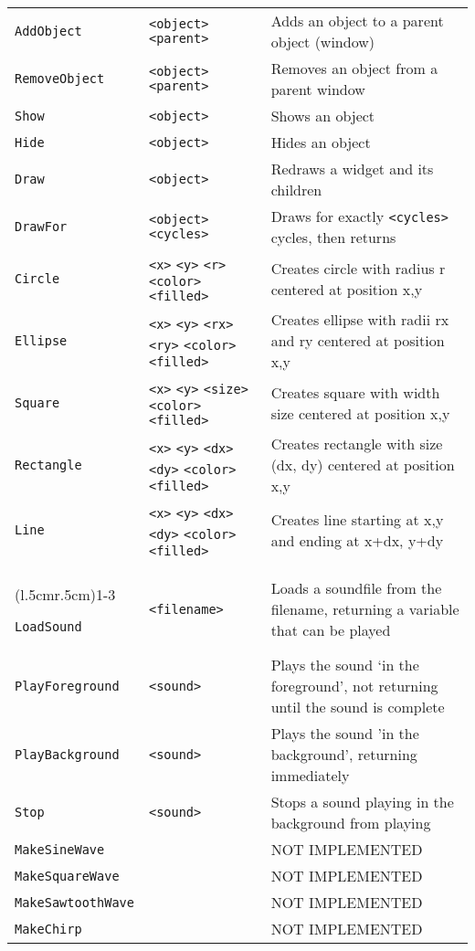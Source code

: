 \begin{longtable}{p{3cm}p{3cm}p{6cm}}
\verb+AddObject+ &\verb+<object>+ \verb+<parent>+ & Adds an object to a parent object (window)\\ 
\verb+RemoveObject+ &\verb+<object>+ \verb+<parent>+ &Removes an object from a parent window\\ 
\verb+Show+ &\verb+<object>+ &Shows an object\\ 
\verb+Hide+ &\verb+<object>+ &Hides an object\\ 
\verb+Draw+ &\verb+<object>+ &Redraws a widget and its children\\ 
\verb+DrawFor+ &\verb+<object>+ \verb+<cycles>+ &Draws for exactly \verb+<cycles>+ cycles, then returns\\ 
\verb+Circle+ &\verb+<x>+ \verb+<y>+ \verb+<r>+  \verb+<color>+ \verb+<filled>+&Creates circle with 
radius r centered at position x,y\\ 
\verb+Ellipse+ &\verb+<x>+ \verb+<y>+ \verb+<rx>+ \verb+<ry>+
\verb+<color>+ \verb+<filled>+&Creates 
ellipse with radii rx and ry centered at position x,y\\ 
\verb+Square+ &\verb+<x>+ \verb+<y>+ \verb+<size>+ \verb+<color>+ \verb+<filled>+&Creates square with 
width size centered at position x,y\\ 
\verb+Rectangle+ &\verb+<x>+ \verb+<y>+ \verb+<dx>+ \verb+<dy>+
\verb+<color>+ \verb+<filled>+ &Creates 
rectangle with size (dx, dy) centered at position x,y\\ 
\verb+Line+ &\verb+<x>+ \verb+<y>+ \verb+<dx>+ \verb+<dy>+  \verb+<color>+ \verb+<filled>+&Creates 
line starting at x,y and ending at x+dx, y+dy\\ 


\addlinespace[0.2cm] 
\midrule 
\multicolumn{3}{c}{\textbf{Sound Objects Functions}}\\ 
\cmidrule(l{.5cm}r{.5cm}){1-3} 


\verb+LoadSound+ &\verb+<filename>+ &Loads a soundfile from the filename, returning a variable that can be played\\ 
\verb+PlayForeground+ &\verb+<sound>+ &Plays the sound `in the foreground', not returning until the sound is complete\\ 
\verb+PlayBackground+ &\verb+<sound>+ &Plays the sound 'in the background', returning immediately\\ 
\verb+Stop+ &\verb+<sound>+ &Stops a sound playing in the background from playing\\ 
\verb+MakeSineWave+ & & NOT IMPLEMENTED\\ 
\verb+MakeSquareWave+ & & NOT IMPLEMENTED\\ 
\verb+MakeSawtoothWave+ & & NOT IMPLEMENTED\\ 
\verb+MakeChirp+ & & NOT IMPLEMENTED\\ 



\end{longtable}
